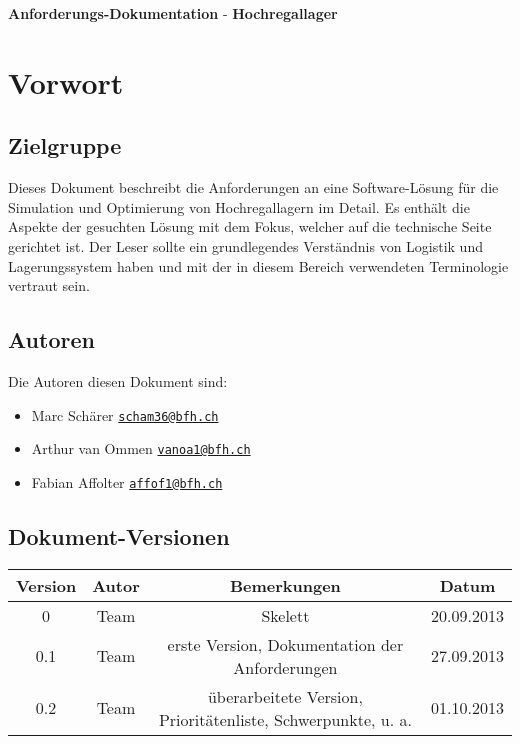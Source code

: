 \documentclass[11pt,a4paper]{article}
\begin{document}
{\huge \textbf{Anforderungs-Dokumentation}} - \textbf{Hochregallager} \\
\tableofcontents

\section{Vorwort}
%
\subsection{Zielgruppe}
Dieses Dokument beschreibt die Anforderungen an eine Software-Lösung für die Simulation und Optimierung von Hochregallagern im Detail. Es enthält die Aspekte der gesuchten Lösung mit dem Fokus, welcher auf die technische Seite gerichtet ist. Der Leser sollte ein grundlegendes Verständnis von Logistik und Lagerungssystem haben und mit der in diesem Bereich verwendeten Terminologie vertraut sein. 
%
\subsection{Autoren}
Die Autoren diesen Dokument sind:
%
\begin{itemize}
  \item Marc Schärer \href{mailto:scham36@bfh.ch}{\nolinkurl{scham36@bfh.ch}}
  \item Arthur van Ommen \href{mailto:vanoa1@bfh.ch}{\nolinkurl{vanoa1@bfh.ch}}
  \item Fabian Affolter \href{mailto:affof11@bfh.ch}{\nolinkurl{affof1@bfh.ch}}
\end{itemize}
%
\subsection{Dokument-Versionen}

\begin{table}[h]

  \begin{center}
    \begin{tabular}{|c|c|c|c|}
      \hline
      \textbf{Version} & \textbf{Autor} & \textbf{Bemerkungen} & Datum\\
      \hline
      0 & Team & Skelett & 20.09.2013\\
      0.1 & Team & erste Version, Dokumentation der Anforderungen &  27.09.2013 \\
      0.2 & Team & überarbeitete Version, Prioritätenliste, Schwerpunkte, u. a. & 01.10.2013 \\
      \hline
    \end{tabular}
  \end{center}
\end{table}
%
%
\end{document}
